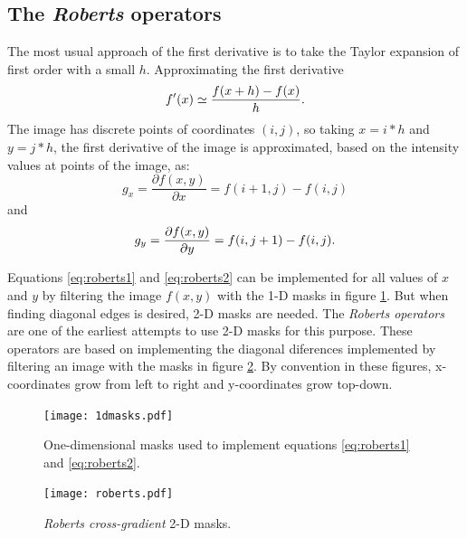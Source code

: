 \documentclass{ipol}
\numberwithin{equation}{section}
\numberwithin{table}{section}
\numberwithin{figure}{section}
\begin{document}

\subsection{The \textit{Roberts} operators}

The most usual approach of the first derivative is to take the Taylor expansion of first order with
a small $h$. Approximating the first derivative
\begin{equation}
	f'(x) \simeq \frac{f(x+h) - f(x)}{h}.\\
\end{equation}
The image has discrete points of coordinates $(i,j)$, so taking $x=i*h$ and $y=j*h$, the 
first derivative of the image is approximated, based on the intensity values ​​at points of the image, as:
\begin{equation}
\label{eq:roberts1}
	g_x = \frac{\partial f(x,y)}{\partial x} = f(i+1,j) - f(i,j)
\end{equation}
and
\begin{equation}
\label{eq:roberts2}
	g_y = \frac{\partial f(x,y)}{\partial y} = f(i,j+1) - f(i,j).\\
\end{equation}

Equations \ref{eq:roberts1} and \ref{eq:roberts2} can be implemented for all values of $x$ and $y$
by filtering the image $f(x,y)$ with the 1-D masks in figure \ref{fig:1dmasks}. But when finding 
diagonal edges is desired, 2-D masks are needed. The \textit{Roberts operators} are one of the earliest 
attempts to use 2-D masks for this purpose. These operators are based on implementing the diagonal 
diferences implemented by filtering an image with the masks in figure \ref{fig:roberts}. By convention 
in these figures, x-coordinates grow from left to right and y-coordinates grow top-down. \\

\begin{figure}
	\centering
	\texttt{[image: 1dmasks.pdf]}
	\caption{One-dimensional masks used to implement equations \ref{eq:roberts1} and \ref{eq:roberts2}.}
	\label{fig:1dmasks}
\end{figure}

\begin{figure}
	\centering
	\texttt{[image: roberts.pdf]}
	\caption{\textit{Roberts cross-gradient} 2-D masks.}
	\label{fig:roberts}
\end{figure}
\end{document}
